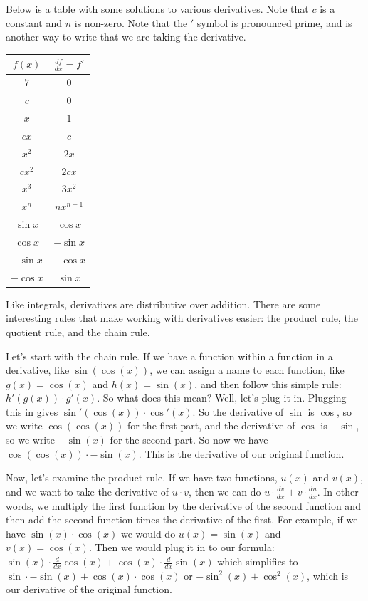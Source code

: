 \documentclass{memoir}
\begin{document}
Below is a table with some solutions to various derivatives. Note that $c$ is a constant and $n$ is non-zero. Note that the $'$ symbol is pronounced prime, and is another way to write that we are taking the derivative. 


\begin{tabular}{c|c}
    $f(x)$ & $\frac{df}{dx} = f'$\\
    \hline
       $7$  & $0$ \\
        $c$ & $0$ \\
        $x$ & $1$ \\
        $cx$ & $c$ \\
        $x^2$ & $2x$ \\
        $cx^2$ & $2cx$ \\
        $x^3$ & $3x^2$ \\
        $x^n$ & $nx^{n-1}$ \\
        $\sin x$ & $\cos x$ \\
        $\cos x$ & $-\sin x$ \\
        $- \sin x$ & $- \cos x$ \\
        $-\cos x$ & $\sin x$
\end{tabular}

Like integrals, derivatives are distributive over addition.
There are some interesting rules that make working with derivatives easier: the product rule, the quotient rule, and the chain rule. 

Let's start with the chain rule. 
If we have a function within a function in a derivative, like $\sin(\cos(x))$, we can assign a name to each function, like $g(x) = \cos(x)$ and $h(x) = \sin(x)$, and then follow this simple rule: $h'(g(x)) \cdot g'(x)$. 
So what does this mean? 
Well, let's plug it in. 
Plugging this in gives $\sin'(\cos(x)) \cdot \cos'(x)$. 
So the derivative of $\sin$ is $\cos$, so we write $\cos(\cos(x))$ for the first part, and the derivative of $\cos$ is $-\sin$, so we write $-\sin(x)$ for the second part. 
So now we have $\cos(\cos(x)) \cdot -\sin(x)$. 
This is the derivative of our original function.

Now, let's examine the product rule. 
If we have two functions, $u(x)$ and $v(x)$, and we want to take the derivative of $u\cdot v$, then we can do $u \cdot \frac{dv}{dx}+ v\cdot\frac{du}{dx}$. 
In other words, we multiply the first function by the derivative of the second function and then add the second function times the derivative of the first. 
For example, if we have $\sin(x)\cdot\cos(x)$ we would do $u(x) = \sin(x)$ and $v(x) = \cos(x)$. 
Then we would plug it in to our formula: $\sin(x)\cdot\frac{d}{dx}\cos(x) + \cos(x)\cdot\frac{d}{dx}\sin(x)$ which simplifies to $\sin\cdot -\sin(x) + \cos(x)\cdot\cos(x)$ or $-\sin^2(x)+\cos^2(x)$, which is our derivative of the original function.
\end{document}
